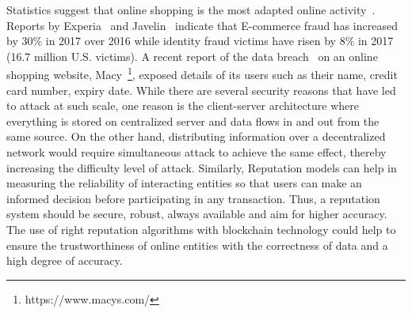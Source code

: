 Statistics suggest that online shopping is the most adapted online
activity~\cite{experian}. Reports by Experia~\cite{experian} and
Javelin~\cite{javelin} indicate that E-commerce fraud has increased by 30\% in
2017 over 2016 while identity fraud victims have risen by 8\% in 2017 (16.7
million U.S. victims). A recent report of the data breach~\cite{macy} on an
online shopping website, Macy~\footnote{https://www.macys.com/}, exposed
details of its users such as their name, credit card number, expiry date. While
there are several security reasons that have led to attack at such scale, one
reason is the client-server architecture where everything is stored on
centralized server and data flows in and out from the same source. On the other
hand, distributing information over a decentralized network would require
simultaneous attack to achieve the same effect, thereby increasing the
difficulty level of attack.  Similarly, Reputation models can help in measuring
the reliability of interacting entities so that users can make an informed
decision before participating in any transaction. Thus, a reputation system
should be secure, robust, always available and aim for higher accuracy. The use
of right reputation algorithms with blockchain technology could help to ensure
the trustworthiness of online entities with the correctness of data and a high
degree of accuracy. 
